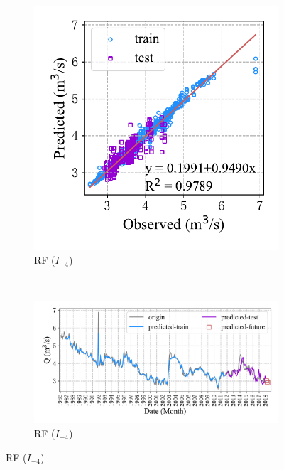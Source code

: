 \begin{figure}[!htbp]
  \\
  \begin{subfigure}[b]{0.305\textwidth}
    \includegraphics[width=\textwidth]{Img/chap4_spr/spr_scatter_in_4_out_4_rf.pdf}
    \vspace{-1.2cm}
    \caption{RF ($I_{-4}$)}
    \label{fig:spr_scatter_in_4_out_4_rf}
  \end{subfigure}
  ~
  \begin{subfigure}[b]{0.615\textwidth}
    \includegraphics[width=\textwidth]{Img/chap4_spr/spr_series_in_4_out_4_rf.pdf}
    \vspace{-1.2cm}
    \caption{RF ($I_{-4}$)}
    \label{fig:spr_series_in_4_out_4_rf}
  \end{subfigure}
  \label{fig:spr_out_4}
\end{figure}

